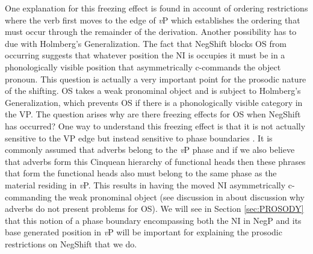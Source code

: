 \documentclass[12pt, letterpaper]{article}
\begin{document}
One explanation for this freezing effect is found in  account of ordering restrictions where the verb first moves to the edge of \emph{v}P which establishes the ordering that must occur through the remainder of the derivation. Another possibility has to due with Holmberg's Generalization. The fact that NegShift blocks OS from occurring suggests that whatever position the NI is occupies it must be in a phonologically visible position that asymmetrically c-commands the object pronoun. This question is actually a very important point for the prosodic nature of the shifting. OS takes a weak pronominal object and is subject to Holmberg's Generalization, which prevents OS if there is a phonologically visible category in the VP. The question arises why are there freezing effects for OS when NegShift has occurred? One way to understand this freezing effect is that it is not actually sensitive to the VP edge but instead sensitive to phase boundaries \citep{chomskyMinimalistInquiriesFramework2000,chomskyDerivationPhase2001,chomskyPhases2008}. It is commonly assumed that adverbs belong to the \emph{v}P phase and if we also believe that adverbs form this Cinquean hierarchy of functional heads then these phrases that form the functional heads also must belong to the same phase as the material residing in \emph{v}P. This results in having the moved NI asymmetrically c-commanding the weak pronominal object (see discussion in \cite{brinkerhoffMATCHINGPhrasesNorwegian2021} about discussion why adverbs do not present problems for OS). We will see in Section \ref{sec:PROSODY} that this notion of a phase boundary encompassing both the NI in NegP and its base generated position in \emph{v}P will be important for explaining the prosodic restrictions on NegShift that we do.
\end{document}
